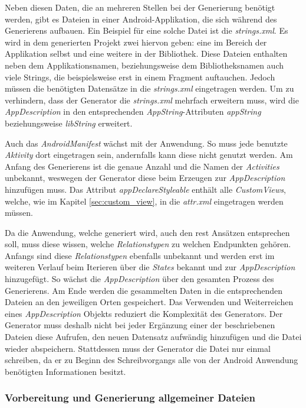\newpage

Neben diesen Daten, die an mehreren Stellen bei der Generierung benötigt werden, gibt es Dateien in einer Android-Applikation, die sich während des Generierens aufbauen. Ein Beispiel für eine solche Datei ist die \textit{strings.xml}. 
Es wird in dem generierten Projekt zwei hiervon geben: eine im Bereich der Applikation selbst und eine weitere in der Bibliothek. Diese Dateien enthalten neben dem Applikationsnamen, beziehungsweise dem Bibliotheksnamen auch viele Strings, die beispielsweise erst in einem Fragment auftauchen. Jedoch müssen die benötigten Datensätze in die \textit{strings.xml} eingetragen werden. Um zu verhindern, dass der Generator die \textit{strings.xml} mehrfach erweitern muss, wird die \textit{AppDescription} in den entsprechenden \textit{AppString}-Attributen \textit{appString} beziehungsweise \textit{libString} erweitert.

Auch das \textit{AndroidManifest} wächst mit der Anwendung. So muss jede benutzte \textit{Aktivity} dort eingetragen sein, andernfalls kann diese nicht genutzt werden. Am Anfang des Generierens ist die genaue Anzahl und die Namen der \textit{Activities} unbekannt, weswegen der Generator diese beim Erzeugen zur \textit{AppDescription} hinzufügen muss. 
Das Attribut \textit{appDeclareStyleable} enthält alle \textit{CustomViews}, welche, wie im Kapitel \ref{sec:custom_view}, in die \textit{attr.xml} eingetragen werden müssen.

Da die Anwendung, welche generiert wird, auch den \acf{rest} Ansätzen entsprechen soll, muss diese wissen, welche \textit{Relationstypen} zu welchen Endpunkten gehören. Anfangs sind diese \textit{Relationstypen} ebenfalls unbekannt und werden erst im weiteren Verlauf beim Iterieren über die \textit{States} bekannt und zur \textit{AppDescription} hinzugefügt.
So wächst die \textit{AppDescription} über den gesamten Prozess des Generierens. Am Ende werden die gesammelten Daten in die entsprechenden Dateien an den jeweiligen Orten gespeichert. Das Verwenden und Weiterreichen eines \textit{AppDescription} Objekts reduziert die Komplexität des Generators. Der Generator muss deshalb nicht bei jeder Ergänzung einer der beschriebenen Dateien diese Aufrufen, den neuen Datensatz aufwändig hinzufügen und die Datei wieder abspeichern. Stattdessen muss der Generator die Datei nur einmal schreiben, da er zu Beginn des Schreibvorgangs alle von der Android Anwendung benötigten Informationen besitzt.

\subsubsection{Vorbereitung und Generierung allgemeiner Dateien}

